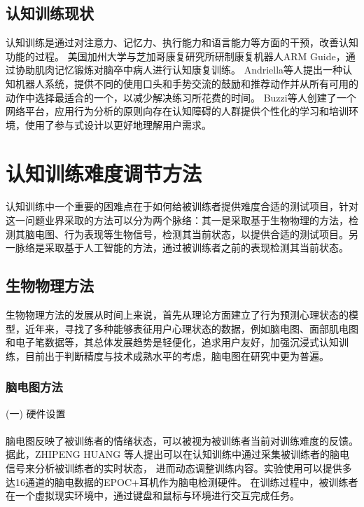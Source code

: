 \documentclass{article}
\begin{document}
        \subsection{认知训练现状}

        认知训练是通过对注意力、记忆力、执行能力和语言能力等方面的干预，改善认知功能的过程。
        美国加州大学与芝加哥康复研究所研制康复机器人ARM Guide，通过协助肌肉记忆锻炼对脑卒中病人进行认知康复训练。
        Andriella等人\cite{ref5}提出一种认知机器人系统，提供不同的使用口头和手势交流的鼓励和推荐动作并从所有可用的动作中选择最适合的一个，以减少解决练习所花费的时间。
        Buzzi等人\cite{ref6}创建了一个网络平台，应用行为分析的原则向存在认知障碍的人群提供个性化的学习和培训环境，使用了参与式设计以更好地理解用户需求。
            \section{认知训练难度调节方法}
            认知训练中一个重要的困难点在于如何给被训练者提供难度合适的测试项目，针对这一问题业界采取的方法可以分为两个脉络：其一是采取基于生物物理的方法，检测其脑电图、行为表现等生物信号，检测其当前状态，以提供合适的测试项目。另一脉络是采取基于人工智能的方法，通过被训练者之前的表现检测其当前状态。
        \subsection{生物物理方法}
        生物物理方法的发展从时间上来说，首先从理论方面建立了行为预测心理状态的模型\cite{ref7}，近年来，寻找了多种能够表征用户心理状态的数据，例如脑电图\cite{ref8}、面部肌电图和电子笔数据等，其总体发展趋势是轻便化，追求用户友好，加强沉浸式认知训练，目前出于判断精度与技术成熟水平的考虑，脑电图在研究中更为普遍。
            \subsubsection{脑电图方法}
            (一) 硬件设置\paragraph{}
            脑电图反映了被训练者的情绪状态，可以被视为被训练者当前对训练难度的反馈。
            据此，ZHIPENG HUANG \cite{ref9}等人提出可以在认知训练中通过采集被训练者的脑电信号来分析被训练者的实时状态，
            进而动态调整训练内容。实验使用可以提供多达16通道的脑电数据的EPOC+耳机作为脑电检测硬件。
            在训练过程中，被训练者在一个虚拟现实环境中，通过键盘和鼠标与环境进行交互完成任务。
\end{document}
